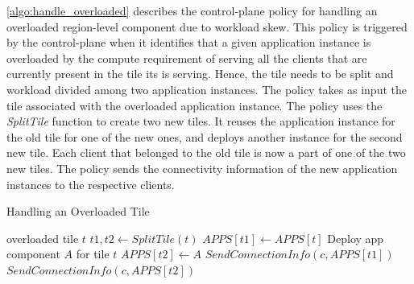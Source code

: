 \cref{algo:handle_overloaded} describes the control-plane policy for handling an overloaded region-level component due to workload skew. This policy is triggered by the control-plane when it identifies that a given application instance is overloaded by the compute requirement of serving all the clients that are currently present in the tile its is serving. Hence, the tile needs to be split and workload divided among two application instances. The policy takes as input the tile associated with the overloaded application instance. The policy uses the \textit{SplitTile} function to create two new tiles. It reuses the application instance for the old tile for one of the new ones, and deploys another instance for the second new tile. Each client that belonged to the old tile is now a part of one of the two new tiles. The policy sends the connectivity information of the new application instances to the respective clients. 
\begin{algorithm}
\caption{Handling an Overloaded Tile}
\begin{algorithmic}
\Require overloaded tile $t$
\State $t1, t2 \gets SplitTile \left( t \right)$
\State $APPS \left[ t1 \right] \gets APPS \left[ t \right]$
\State Deploy app component $A$ for tile $t$
\State $APPS  \left[ t2 \right] \gets A$
    \State $SendConnectionInfo \left(c, APPS \left[ t1 \right] \right)$
\EndFor
{}
    \State $SendConnectionInfo \left(c, APPS \left[ t2 \right] \right)$
\EndFor
\end{algorithmic}
\label{algo:handle_overloaded}
\end{algorithm}

